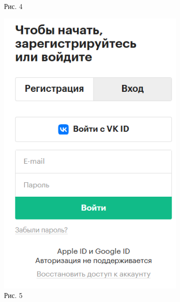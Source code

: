 \documentclass{scrreprt}
\begin{document}
\begin{figure}[ht]
\begin{subfigure}[b]{0.3\textwidth}
 		\caption{Рис. 4} 
 	\end{subfigure}
 	\hfill
 	\begin{subfigure}[b]{0.3\textwidth}
 		\includegraphics[width=\textwidth]{e}
 		\caption{Рис. 5}
 	\end{subfigure}
 	\hfill
 	\begin{subfigure}[b]{0.3\textwidth}

\end{subfigure}
\end{figure}
\end{document}
